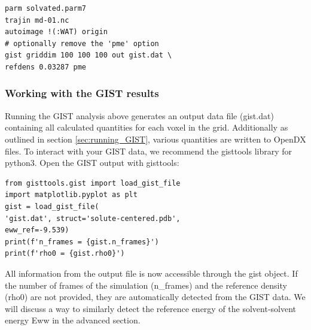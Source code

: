 \documentclass[9pt,tutorial]{livecoms}
\begin{document}
\begin{lstlisting}[style=cpptraj]
parm solvated.parm7
trajin md-01.nc
autoimage !(:WAT) origin
# optionally remove the 'pme' option
gist griddim 100 100 100 out gist.dat \
refdens 0.03287 pme
\end{lstlisting}
\subsubsection{Working with the GIST results}
Running the GIST analysis above generates an output data file (gist.dat) containing all calculated quantities for each voxel in the grid. 
Additionally as outlined in section \ref{sec:running_GIST}, various quantities are written to OpenDX files.
To interact with your GIST data, we recommend the gisttools library for python3. Open the GIST output with gisttools:
\begin{lstlisting}[style=python]
from gisttools.gist import load_gist_file
import matplotlib.pyplot as plt
gist = load_gist_file(
'gist.dat', struct='solute-centered.pdb',  
eww_ref=-9.539)
print(f'n_frames = {gist.n_frames}')
print(f'rho0 = {gist.rho0}')
\end{lstlisting}
All information from the output file is now accessible through the gist object. 
If the number of frames of the simulation (n\_frames) and the reference density (rho0) are not provided, they are automatically detected from the GIST data. 
We will discuss a way to similarly detect the reference energy of the solvent-solvent energy Eww in the advanced section.
\end{document}
